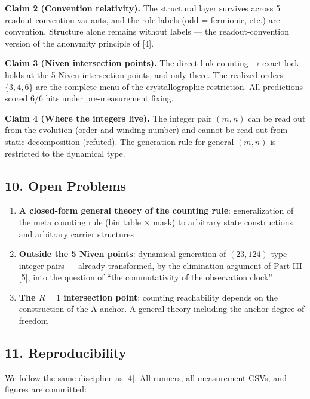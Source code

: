 \documentclass[
  a4paper,
]{article}
\providecommand{\tightlist}{%
  \setlength{\itemsep}{0pt}\setlength{\parskip}{0pt}}
\begin{document}
\textbf{Claim 2 (Convention relativity).} The structural layer survives
across 5 readout convention variants, and the role labels (odd =
fermionic, etc.) are convention. Structure alone remains without labels
--- the readout-convention version of the anonymity principle of
{[}4{]}.

\textbf{Claim 3 (Niven intersection points).} The direct link counting →
exact lock holds at the 5 Niven intersection points, and only there. The
realized orders \(\{3,4,6\}\) are the complete menu of the
crystallographic restriction. All predictions scored 6/6 hits under
pre-measurement fixing.

\textbf{Claim 4 (Where the integers live).} The integer pair \((m,n)\)
can be read out from the evolution (order and winding number) and cannot
be read out from static decomposition (refuted). The generation rule for
general \((m,n)\) is restricted to the dynamical type.

\subsection{10. Open Problems}\label{open-problems}

\begin{enumerate}
\def\labelenumi{\arabic{enumi}.}
\tightlist
\item
  \textbf{A closed-form general theory of the counting rule}:
  generalization of the meta counting rule (bin table × mask) to
  arbitrary state constructions and arbitrary carrier structures
\item
  \textbf{Outside the 5 Niven points}: dynamical generation of
  \((23,124)\)-type integer pairs --- already transformed, by the
  elimination argument of Part III {[}5{]}, into the question of ``the
  commutativity of the observation clock''
\item
  \textbf{The \(R=1\) intersection point}: counting reachability depends
  on the construction of the A anchor. A general theory including the
  anchor degree of freedom
\end{enumerate}

\subsection{11. Reproducibility}\label{reproducibility}

We follow the same discipline as {[}4{]}. All runners, all measurement
CSVs, and figures are committed:
\end{document}
